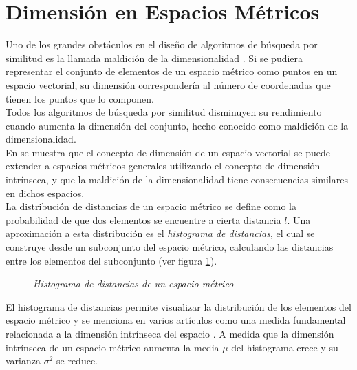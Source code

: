 


\section{Dimensi\'on en Espacios M\'etricos}

Uno de los grandes obst\'aculos en el dise\~no de algoritmos de b\'usqueda por similitud es la llamada maldici\'on de la dimensionalidad \cite{oursurvey}. Si se pudiera representar el conjunto de elementos de un espacio m\'etrico como puntos en un espacio vectorial, su dimensi\'on corresponder\'ia al n\'umero de coordenadas que tienen los puntos que lo componen. \\

Todos los algoritmos de b\'usqueda por similitud disminuyen su rendimiento cuando aumenta la  dimensi\'on del conjunto, hecho conocido como maldici\'on de la dimensionalidad. \\

En \cite{oursurvey} se muestra que el concepto de dimensi\'on de un espacio vectorial se puede extender a espacios m\'etricos generales utilizando el concepto de dimensi\'on intr\'inseca, y que la maldici\'on de la dimensionalidad tiene consecuencias similares en dichos espacios.\\

La distribuci\'on de distancias de un espacio m\'etrico se define como la probabilidad de que dos elementos se encuentre a cierta distancia $l$. Una aproximaci\'on a esta distribuci\'on es el \textit{histograma de distancias}, el cual se construye desde un subconjunto del espacio m\'etrico, calculando las distancias entre los elementos del subconjunto (ver figura \ref{defineH}).\\
 
 \begin{figure}[tb!]
\centerline{%
  }
  \caption [Histograma de distancias de un espacio m\'etrico]
  {\footnotesize {\textsl {Histograma de distancias de un espacio m\'etrico}}}
\label{defineH}
\end{figure}

El histograma de distancias permite visualizar la distribuci\'on de los elementos del espacio m\'etrico y se menciona en varios art\'iculos como una medida fundamental relacionada a la dimensi\'on intr\'inseca del espacio \cite{Bri95, CM97, cn00,alenex,CPZ98a}. A medida que la dimensi\'on intr\'inseca de un espacio m\'etrico aumenta la media  $\mu$ del histograma crece y su varianza $\sigma^{2}$ se reduce.\\

